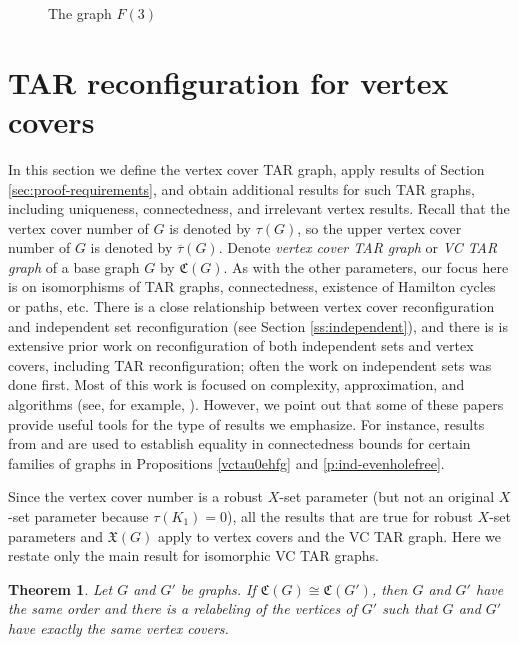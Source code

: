 \documentclass{article}
\numberwithin{figure}{section}
\numberwithin{table}{section}
\numberwithin{equation}{section}
\newtheorem{thm}{Theorem}[section]
\theoremstyle{definition}
\theoremstyle{definition}
\theoremstyle{definition}
\newcommand{\ol}{\overline}
\newcommand{\vc}{\tau}
\newcommand{\vcbar}{\ol\vc}
\newcommand{\xrtar}{\mathfrak{X}}%
\newcommand{\vctar}{\mathfrak{C}}%
\begin{document}
{\begin{figure}[!h]
{}
\caption{The graph $F(3)$}
\label{fig: xxxxxxxxx}
\end{figure}


\section{TAR reconfiguration for vertex covers}\label{s:vtxcover}
    In this section  we  define the vertex cover TAR graph, apply results of Section \ref{sec:proof-requirements}, and obtain additional results for such TAR graphs, including uniqueness, connectedness, and irrelevant vertex results.  Recall that the vertex cover  number of $G$ is denoted by $\tau(G)$, so the upper vertex cover  number of $G$ is denoted  by $\vcbar(G)$.  
   Denote \emph{vertex cover TAR graph}  or \emph{VC TAR graph} of a  base graph  $G$ by  $\vctar(G)$. 
 As with the other parameters, our focus here is on isomorphisms of TAR graphs, connectedness, existence of Hamilton cycles or paths, etc.  There is a close relationship between vertex cover reconfiguration  and independent set reconfiguration (see Section \ref{ss:independent}), and there is
is extensive prior work on reconfiguration of both independent sets and vertex covers, including TAR reconfiguration; often the work on independent sets was done first.
Most of this work is focused on complexity, approximation, and algorithms (see, for example, \cite{vtxcov-recon, IDHPSUU11, INZ15, KMM12}).  However, we point out that some of these papers provide useful tools for the type of results we emphasize.  For instance, results from \cite{INZ15} and \cite{KMM12} are used to establish equality in  connectedness bounds for certain families of graphs in Propositions \ref{vctau0ehfg} and \ref{p:ind-evenholefree}.





Since the vertex cover number is a robust $X$-set parameter  (but not an original $X$-set parameter because $\vc(K_1)=0$),  all the results that are true for robust $X$-set parameters and $\xrtar(G)$ apply to vertex covers and the VC TAR graph.  
Here we restate only the main result for isomorphic VC TAR graphs.

\begin{thm}\label{t:main-vc}  Let $G$ and $G'$ be graphs. If $\vctar(G)\cong\vctar(G')$, then  $G$ and $G'$ have the same order and  there is a relabeling of the vertices of $G'$ such that $G$ and $G'$ have exactly the same vertex covers.  
\end{thm}

}
\end{document}
